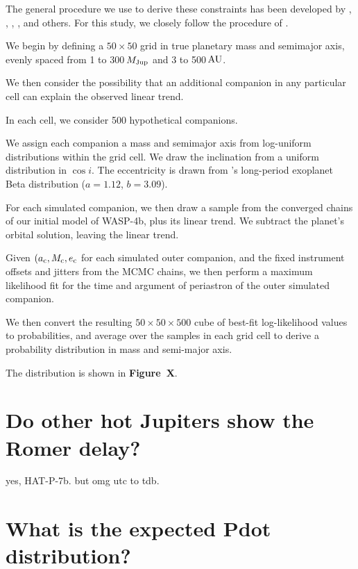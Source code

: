 \documentclass[12pt,twocolumn,tighten]{aastex62}
\begin{document}
The general procedure we use to derive these constraints has been developed by
\citet{wright_linear_trends_2007}, \citet{montet_trends_2014},
\citet{knutson_friends_2014}, \citet{bryan_statistics_2016,bryan_excess_2019},
and others.
For this study, we closely follow the procedure of \citet{bryan_excess_2019}.

We begin by defining a $50\times50$ grid in true planetary mass and semimajor
axis, evenly spaced from 1 to 300$\,$$M_{\rm Jup}$ and 3 to 500$\,$${\rm AU}$.

We then consider the possibility that an additional companion in any particular
cell can explain the observed linear trend.

In each cell, we consider 500 hypothetical companions.

We assign each companion a mass and semimajor axis from log-uniform
distributions within the grid cell. We draw the inclination from a uniform
distribution in $\cos i$.  The eccentricity is drawn from
\citet{kipping_beta_2013}'s long-period exoplanet Beta distribution ($a=1.12$,
$b=3.09$).

For each simulated companion, we then draw a sample from the converged chains
of our initial model of WASP-4b, plus its linear trend. We subtract
the planet's orbital solution, leaving the linear trend.

Given $(a_{\rm c}, M_{\rm c}, e_{\rm c}$ for each simulated outer companion,
and the fixed instrument offsets and jitters from the MCMC chains, we then
perform a maximum likelihood fit for the time and argument of periastron of the
outer simulated companion.

We then convert the resulting $50\times50\times500$ cube of best-fit
log-likelihood values to probabilities, and average over the samples in
each grid cell to derive a probability distribution in mass and semi-major
axis.

The distribution is shown in {\bf Figure~X}.


\section{Do other hot Jupiters show the Romer delay?}
yes, HAT-P-7b. but omg utc to tdb.


\section{What is the expected Pdot distribution?}
\end{document}
